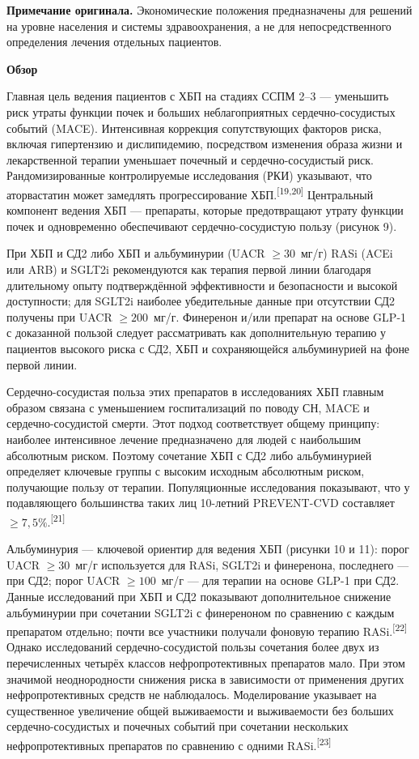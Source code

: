 \documentclass[11pt,a4paper]{article}
\newcommand{\src}[1]{\textsuperscript{[#1]}}
\newcommand{\heading}[1]{\par\medskip\textbf{#1}\par}
\begin{document}
\textbf{Примечание оригинала.} Экономические положения предназначены для решений на уровне населения и системы здравоохранения, а не для непосредственного определения лечения отдельных пациентов.

\heading{Обзор}
Главная цель ведения пациентов с ХБП на стадиях ССПМ 2--3 --- уменьшить риск утраты функции почек и больших неблагоприятных сердечно-сосудистых событий (MACE). Интенсивная коррекция сопутствующих факторов риска, включая гипертензию и дислипидемию, посредством изменения образа жизни и лекарственной терапии уменьшает почечный и сердечно-сосудистый риск. Рандомизированные контролируемые исследования (РКИ) указывают, что аторвастатин может замедлять прогрессирование ХБП.\src{19,20} Центральный компонент ведения ХБП --- препараты, которые предотвращают утрату функции почек и одновременно обеспечивают сердечно-сосудистую пользу (рисунок 9).

При ХБП и СД2 либо ХБП и альбуминурии (UACR $\geq30$~мг/г) RASi (ACEi или ARB) и SGLT2i рекомендуются как терапия первой линии благодаря длительному опыту подтверждённой эффективности и безопасности и высокой доступности; для SGLT2i наиболее убедительные данные при отсутствии СД2 получены при UACR $\geq200$~мг/г. Финеренон и/или препарат на основе GLP-1 с доказанной пользой следует рассматривать как дополнительную терапию у пациентов высокого риска с СД2, ХБП и сохраняющейся альбуминурией на фоне первой линии.

Сердечно-сосудистая польза этих препаратов в исследованиях ХБП главным образом связана с уменьшением госпитализаций по поводу СН, MACE и сердечно-сосудистой смерти. Этот подход соответствует общему принципу: наиболее интенсивное лечение предназначено для людей с наибольшим абсолютным риском. Поэтому сочетание ХБП с СД2 либо альбуминурией определяет ключевые группы с высоким исходным абсолютным риском, получающие пользу от терапии. Популяционные исследования показывают, что у подавляющего большинства таких лиц 10-летний PREVENT-CVD составляет $\geq7{,}5\%$.\src{21}

Альбуминурия --- ключевой ориентир для ведения ХБП (рисунки 10 и 11): порог UACR $\geq30$~мг/г используется для RASi, SGLT2i и финеренона, последнего --- при СД2; порог UACR $\geq100$~мг/г --- для терапии на основе GLP-1 при СД2. Данные исследований при ХБП и СД2 показывают дополнительное снижение альбуминурии при сочетании SGLT2i с финереноном по сравнению с каждым препаратом отдельно; почти все участники получали фоновую терапию RASi.\src{22} Однако исследований сердечно-сосудистой пользы сочетания более двух из перечисленных четырёх классов нефропротективных препаратов мало. При этом значимой неоднородности снижения риска в зависимости от применения других нефропротективных средств не наблюдалось. Моделирование указывает на существенное увеличение общей выживаемости и выживаемости без больших сердечно-сосудистых и почечных событий при сочетании нескольких нефропротективных препаратов по сравнению с одними RASi.\src{23}
\end{document}
